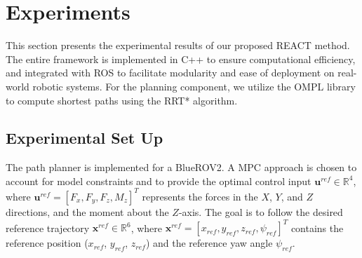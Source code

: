 \section{Experiments}
\label{sec:experiments}





%
%








This section presents the experimental results of our proposed \ac{REACT} method. The entire framework is implemented in C++ to ensure computational efficiency, and integrated with ROS to facilitate modularity and ease of deployment on real-world robotic systems. For the planning component, we utilize the \ac{OMPL} library \cite{ompl} to compute shortest paths using the RRT* algorithm.  


\subsection{Experimental Set Up}
The path planner is implemented for a BlueROV2. A \ac{MPC} approach is chosen to account for model constraints and to provide the optimal control input $\mathbf{u}^{ref} \in \mathbb{R}^4$, where $\mathbf{u}^{ref} = [F_x, F_y, F_z, M_z]^T$ represents the forces in the $X$, $Y$, and $Z$ directions, and the moment about the $Z$-axis. The goal is to follow the desired reference trajectory $\mathbf{x}^{ref} \in \mathbb{R}^6$, where $\mathbf{x}^{ref} = [x_{ref}, y_{ref}, z_{ref}, \psi_{ref}]^T$ contains the reference position ($x_{ref}$, $y_{ref}$, $z_{ref}$) and the reference yaw angle $\psi_{ref}$.

